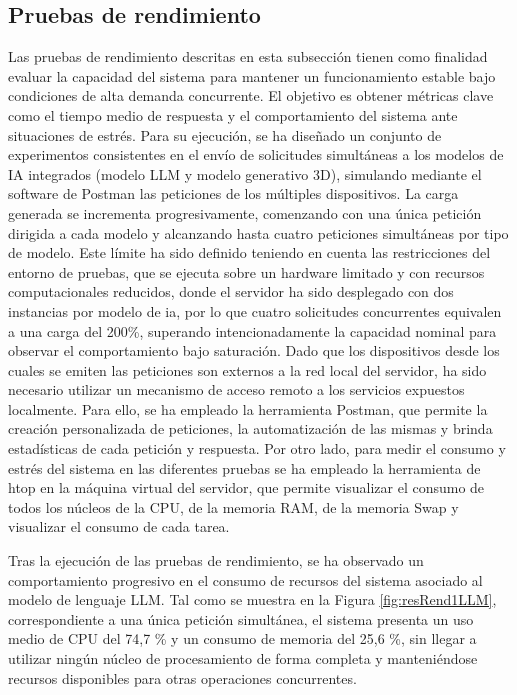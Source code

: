 \subsection{Pruebas de rendimiento}
Las pruebas de rendimiento descritas en esta subsección tienen como finalidad evaluar la capacidad del sistema para mantener un funcionamiento estable bajo condiciones de alta demanda concurrente. El objetivo es obtener métricas clave como el tiempo medio de respuesta y el comportamiento del sistema ante situaciones de estrés. Para su ejecución, se ha diseñado un conjunto de experimentos consistentes en el envío de solicitudes simultáneas a los modelos de IA integrados (modelo LLM y modelo generativo 3D), simulando mediante el software de Postman las peticiones de los múltiples dispositivos. La carga generada se incrementa progresivamente, comenzando con una única petición dirigida a cada modelo y alcanzando hasta cuatro peticiones simultáneas por tipo de modelo. Este límite ha sido definido teniendo en cuenta las restricciones del entorno de pruebas, que se ejecuta sobre un hardware limitado y con recursos computacionales reducidos, donde el servidor ha sido desplegado con dos instancias por modelo de \gls{ia}, por lo que cuatro solicitudes concurrentes equivalen a una carga del 200\%, superando intencionadamente la capacidad nominal para observar el comportamiento bajo saturación. Dado que los dispositivos desde los cuales se emiten las peticiones son externos a la red local del servidor, ha sido necesario utilizar un mecanismo de acceso remoto a los servicios expuestos localmente. Para ello, se ha empleado la herramienta Postman, que permite la creación personalizada de peticiones, la automatización de las mismas y brinda estadísticas de cada petición y respuesta. Por otro lado, para medir el consumo y estrés del sistema en las diferentes pruebas se ha empleado la herramienta de htop en la máquina virtual del servidor, que permite visualizar el consumo de todos los núcleos de la CPU, de la memoria RAM, de la memoria Swap y visualizar el consumo de cada tarea.

Tras la ejecución de las pruebas de rendimiento, se ha observado un comportamiento progresivo en el consumo de recursos del sistema asociado al modelo de lenguaje LLM. Tal como se muestra en la Figura \ref{fig:resRend1LLM}, correspondiente a una única petición simultánea, el sistema presenta un uso medio de CPU del 74,7 \% y un consumo de memoria del 25,6 \%, sin llegar a utilizar ningún núcleo de procesamiento de forma completa y manteniéndose recursos disponibles para otras operaciones concurrentes.

